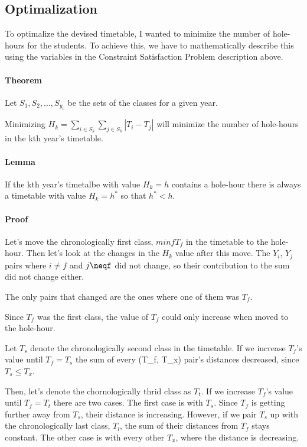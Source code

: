\subsection{Optimalization}

To optimalize the devised timetable, I wanted to minimize the number of hole-hours for the students. To achieve this, we have to mathematically describe this using the variables in the Constraint Satisfaction Problem description above.

\paragraph{Theorem}

Let $S_1,S_2,...,S_{y_c}$ be the sets of the classes for a given year.

Minimizing $H_k = \sum\limits_{i\in{}S_k}\sum\limits_{j\in{}S_k}|T_i - T_j|$ will minimize the number of hole-hours in the kth year's timetable.

\paragraph{Lemma}

If the kth year's timetalbe with value $H_k = h$ contains a hole-hour there is always a timetable with value $H_k=h^*$ so that $h^* < h$.

\paragraph{Proof}

Let's move the chronologically first class, $min\limits{f}T_f$ in the timetable to the hole-hour. Then let's look at the changes in the $H_k$ value after this move. The $Y_i$, $Y_j$ pairs where $i\neq{}f$ and $j\neqf$ did not change, so their contribution to the sum did not change either.

The only pairs that changed are the ones where one of them was $T_f$.

Since $T_f$ was the first class, the value of $T_f$ could only increase when moved to the hole-hour.

Let $T_s$ denote the chronologically second class in the timetable. If we increase $T_f$'s value until $T_f = T_s$ the sum of every (T_f, T_x) pair's distances decreased, since $T_s\leq{}T_x$.

Then, let's denote the chornologically thrid class as $T_t$. If we increase  $T_f$'s value until $T_f = T_t$ there are two cases. The first case is with $T_s$. Since $T_f$ is getting further away from $T_s$, their distance is increasing. However, if we pair $T_s$ up with the chronologically last class, $T_l$, the sum of their distances from $T_f$ stays constant. The other case is with every other $T_x$, where the distance is decreasing.

